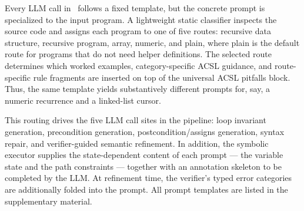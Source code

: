 \label{sec:prompt}

\DIFaddbegin
\noindent
Every LLM call in \toolname\ follows a fixed template, but the concrete prompt is specialized to the input program. A lightweight static classifier inspects the source code and assigns each program to one of five routes: recursive data structure, recursive program, array, numeric, and plain, where plain is the default route for programs that do not need helper definitions. The selected route determines which worked examples, category-specific ACSL guidance, and route-specific rule fragments are inserted on top of the universal ACSL pitfalls block. Thus, the same template yields substantively different prompts for, say, a numeric recurrence and a linked-list cursor.
\DIFaddend

\DIFaddbegin
This routing drives the five LLM call sites in the pipeline: loop invariant generation, precondition generation, postcondition/assigns generation, syntax repair, and verifier-guided semantic refinement. In addition, the symbolic executor supplies the state-dependent content of each prompt --- the variable state and the path constraints --- together with an annotation skeleton to be completed by the LLM. At refinement time, the verifier's typed error categories are additionally folded into the prompt. All prompt templates are listed in the supplementary material.
\DIFaddend
